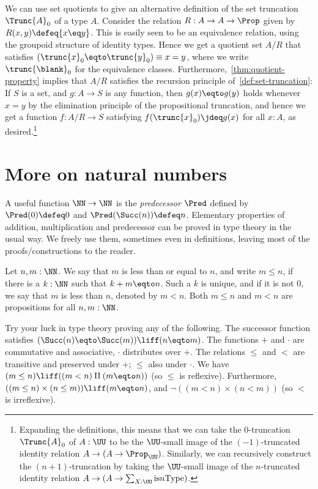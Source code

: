 We can use set quotients to give an alternative definition
of the set truncation $\Trunc{A}_0$ of a type $A$.
Consider the relation $R : A \to A \to \Prop$ given by
$R(x,y) \defeq {x \eq y}$.
This is easily seen to be an equivalence relation,
using the groupoid structure of identity types.
Hence we get a quotient set $A/R$ that satisfies
$(\trunc{x}_0 \eqto \trunc{y}_0) \equiv x=y$,
where we write $\trunc{\blank}_0$ for the equivalence classes.
Furthermore,~\cref{thm:quotient-property} implies that
$A/R$ satisfies the recursion principle of~\cref{def:set-truncation}:
If $S$ is a set, and $g:A\to S$ is any function,
then $g(x) \eqto g(y)$ holds whenever ${x=y}$
by the elimination principle
of the propositional truncation,
and hence we get a function $f : A/R \to S$ satisfying
$f(\trunc{x}_0)\jdeq g(x)$ for all $x:A$, as desired.\footnote{%
  Expanding the definitions,
  this means that we can take the $0$-truncation $\Trunc{A}_0$
  of $A:\UU$ to be the $\UU$-small image
  of the $(-1)$-truncated identity relation
  $A \to (A \to \Prop_\UU)$.
  Similarly, we can recursively construct the $(n+1)$-truncation
  by taking the $\UU$-small image
  of the $n$-truncated identity relation
  $A \to (A \to \sum_{X:\UU}\mathrm{is}{n}\mathrm{Type})$.}

\section{More on natural numbers}
\label{sec:more-on-N}

A useful function $\NN\to\NN$ is the \emph{predecessor} $\Pred$ defined by
$\Pred(0)\defeq 0$ and $\Pred(\Succ(n))\defeq n$.
Elementary properties of addition, multiplication and predecessor
can be proved in type theory in the usual way.
We freely use them, sometimes even in definitions, leaving most of the
proofs/constructions to the reader.

\begin{definition}
\label{def:orderonN}
Let $n,m:\NN$. We say that $m$ is less than or equal to $n$, and write $m\leq n$,
if there is a $k:\NN$ such that $k+m \eqto n$. Such a $k$ is unique, and if it
is not $0$, we say that $m$ is less than $n$, denoted by $m<n$.
Both $m\leq n$ and $m<n$ are propositions for all $n,m:\NN$.
\end{definition}

\begin{xca}\label{xca:try-your-luck-N}
Try your luck in type theory proving any of the following.
The successor function satisfies $(\Succ(n) \eqto \Succ(m))\liff(n \eqto m)$.
The functions $+$ and $\cdot$ are commutative and associative,
$\cdot$ distributes over $+$.
The relations $\leq$ and $<$ are transitive and
preserved under $+$; $\leq$ also under $\cdot$.
We have $(m\leq n) \liff ((m<n)\amalg(m \eqto n))$ (so $\leq$ is reflexive).
Furthermore, $((m\leq n)\times (n\leq m)) \liff (m \eqto n)$,
and $\neg ((m<n)\times(n<m))$ (so $<$ is irreflexive).
\end{xca}

